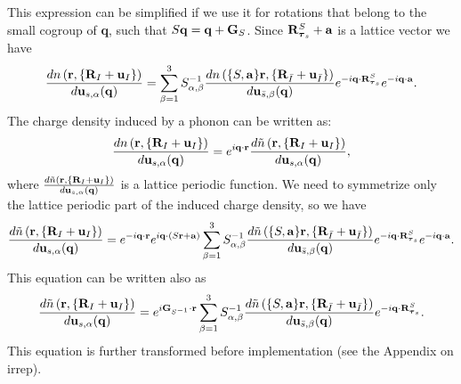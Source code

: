 \documentclass[12pt,a4paper,twoside]{report}
\begin{document}
This expression can be simplified if we use it for rotations that belong to the small cogroup of {\bf q}, such that $S{\bf q}={\bf q}+{\bf G}_S$.
Since ${\bf R}^S_{{\boldsymbol{\tau}_s}}+{\bf a}$ is a lattice vector we have
\begin{equation}
{d n\left({\bf r}, \{{\bf R}_I + {\bf u}_I\}\right)
\over d {\bf u}_{s,\alpha}({\bf q})} = \sum_{\beta=1}^3 S^{-1}_{\alpha,\beta} {d n\left(\{S,{\bf a}\} {\bf r}, \{{\bf R}_{\bar I} + {\bf u}_{\bar I}\}\right)
\over d {\bf u}_{\bar s,\beta} ({\bf q})} e^{-i{\bf q}\cdot {\bf R}^S_{{\boldsymbol{\tau}_s}}} e^{-i{\bf q}\cdot {\bf a}}.
\end{equation}
The charge density induced by a phonon can be written as:
\begin{equation}
{d n\left({\bf r}, \{{\bf R}_I + {\bf u}_I\}\right)
\over d {\bf u}_{s,\alpha}({\bf q})} = 
e^{i {\bf q} \cdot {\bf r}} {d \tilde n\left({\bf r}, \{{\bf R}_I + {\bf u}_I\}\right)
\over d {\bf u}_{s,\alpha}({\bf q})},
\end{equation}
where ${d \tilde n\left({\bf r}, \{{\bf R}_I + {\bf u}_I\}\right)
\over d {\bf u}_{s,\alpha}({\bf q})}$ is a lattice periodic function.
We need to symmetrize only the lattice periodic
part of the induced charge density, so we have
\begin{equation}
{d \tilde n\left({\bf r}, \{{\bf R}_I + {\bf u}_I\}\right)
\over d {\bf u}_{s,\alpha}({\bf q})} 
= e^{-i{\bf q} \cdot {\bf r}}
e^{i{\bf q}\cdot (S {\bf r} + {\bf a})}
\sum_{\beta=1}^3 S^{-1}_{\alpha,\beta} {d \tilde n\left(\{S,{\bf a}\} {\bf r}, \{{\bf R}_{\bar I} + {\bf u}_{\bar I}\}\right)
\over d {\bf u}_{\bar s,\beta} ({\bf q})} e^{-i{\bf q}\cdot {\bf R}^S_{{\boldsymbol{\tau}_s}}} e^{-i{\bf q}\cdot {\bf a}}.
\end{equation}
This equation can be written also as 
\begin{equation}
{d \tilde n\left({\bf r}, \{{\bf R}_I + {\bf u}_I\}\right)
\over d {\bf u}_{s,\alpha}({\bf q})} 
= e^{i{\bf G}_{S^{-1}} \cdot {\bf r}}
\sum_{\beta=1}^3 S^{-1}_{\alpha,\beta} {d \tilde n\left(\{S,{\bf a}\} {\bf r}, \{{\bf R}_{\bar I} + {\bf u}_{\bar I}\}\right)
\over d {\bf u}_{\bar s,\beta} ({\bf q})} e^{-i{\bf q}\cdot {\bf R}^S_{{\boldsymbol{\tau}_s}}}.
\label{symdrho}
\end{equation}
This equation is further transformed before implementation (see the Appendix on irrep).
\end{document}
